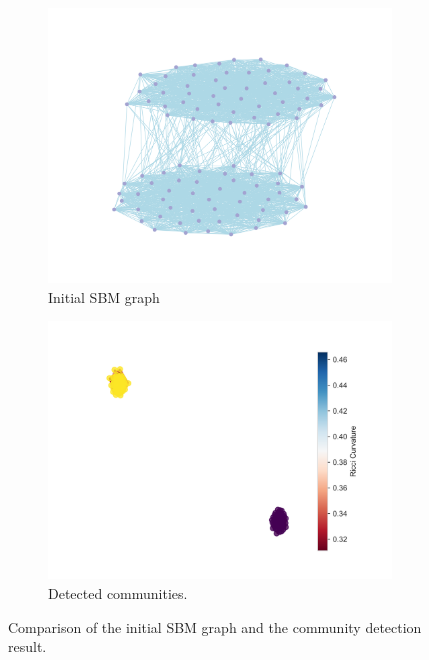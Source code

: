 \documentclass[12pt,a4paper]{article}
\begin{document}
\begin{figure}[h]
    \centering
    \begin{subfigure}[b]{0.45\textwidth}
        \centering
        \includegraphics[width=\textwidth]{ToyModelResults/SBM_results/BeforeRicciFlow.png}
        \caption{Initial SBM graph}
        \label{fig:sbm_initial}
    \end{subfigure}
    \hfill
    \begin{subfigure}[b]{0.45\textwidth}
        \centering
        \includegraphics[width=\textwidth]{ToyModelResults/SBM_results/Communities.png}
        \caption{Detected communities.}
        \label{fig:sbm_result}
    \end{subfigure}
    \caption{Comparison of the initial SBM graph and the community detection result.}
    \label{fig2}
\end{figure}
\end{document}
